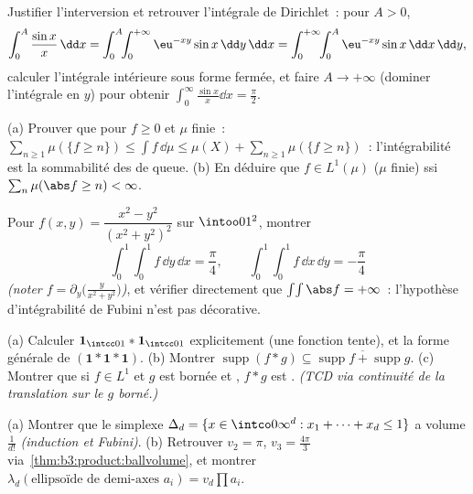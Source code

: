 \begin{exercise}[$\star$]\label{exo:b3:product:2}
Justifier l'interversion et retrouver l'intégrale de
Dirichlet~: pour $A > 0$,
\[
\int_0^A\frac{\sin x}x\,\dd x
= \int_0^A\!\!\int_0^{+\infty}\eu^{-xy}\sin x\,\dd y\,\dd x
= \int_0^{+\infty}\!\!\int_0^A \eu^{-xy}\sin x\,\dd x\,\dd y,
\]
calculer l'intégrale intérieure sous forme fermée, et faire
$A \to +\infty$ (dominer l'intégrale en $y$) pour obtenir
$\int_0^\infty\frac{\sin x}x\dd x = \frac\pi2$.
\end{exercise}

\begin{exercise}[$\star\star$]\label{exo:b3:product:3}
(a) Prouver que pour $f \geq 0$  et $\mu$ finie~:
$\sum_{n\geq1}\mu(\{f \geq n\}) \leq \int f\,\dd\mu \leq
\mu(X) + \sum_{n\geq1}\mu(\{f\geq n\})$~: l'intégrabilité est
la sommabilité des  de queue.
(b) En déduire que $f \in L^1(\mu)$ ($\mu$ finie) ssi
$\sum_n\mu(\abs f \geq n) < \infty$.
\end{exercise}

\begin{exercise}[$\star\star$]\label{exo:b3:product:4}
Pour $f(x, y) = \dfrac{x^2 - y^2}{(x^2 + y^2)^2}$ sur
$\intoo01^2$, montrer
\[
\int_0^1\!\!\int_0^1 f\,\dd y\,\dd x = \frac\pi4,
\qquad
\int_0^1\!\!\int_0^1 f\,\dd x\,\dd y = -\frac\pi4
\]
\emph{(noter $f = \partial_y\bigl(\frac{y}{x^2+y^2}\bigr)$)},
et vérifier directement que $\int\!\int\abs f = +\infty$~:
l'hypothèse d'intégrabilité de Fubini n'est pas décorative.
\end{exercise}

\begin{exercise}[$\star\star$]\label{exo:b3:product:5}
(a) Calculer $\mathbf 1_{\intcc01} * \mathbf 1_{\intcc01}$
explicitement (une fonction tente), et la forme générale de
$(\mathbf 1 * \mathbf 1 * \mathbf 1)$.
(b) Montrer $\operatorname{supp}(f * g) \subseteq
\overline{\operatorname{supp}f + \operatorname{supp}g}$.
(c) Montrer que si $f \in L^1$ et $g$ est bornée et ,
$f * g$ est . \emph{(TCD via continuité de la
translation sur le $g$ borné.)}
\end{exercise}

\begin{exercise}[$\star\star$]\label{exo:b3:product:6}
(a) Montrer que le simplexe $\Delta_d = \{x \in
\intco0\infty^d : x_1 + \dots + x_d \leq 1\}$ a volume
$\frac1{d!}$ \emph{(induction et Fubini)}.
(b) Retrouver $v_2 = \pi$, $v_3 = \frac{4\pi}3$
via~\cref{thm:b3:product:ballvolume}, et montrer
$\lambda_d(\text{ellipsoïde de demi-axes } a_i) =
v_d\prod a_i$.
\end{exercise}

